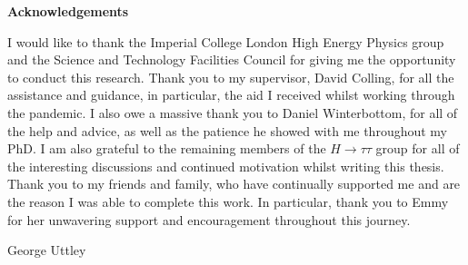 \begin{titlepage}
\newpage


\vspace*{\fill}
\begin{adjustwidth}{1cm}{1cm}
\begin{center}
\Large \textbf{Acknowledgements}
\vspace{0.5cm}
\end{center}

I would like to thank the Imperial College London High Energy Physics group and the Science and Technology Facilities Council for giving me the opportunity to conduct this research.
Thank you to my supervisor, David Colling, for all the assistance and guidance, in particular, the aid I received whilst working through the pandemic.
I also owe a massive thank you to Daniel Winterbottom, for all of the help and advice, as well as the patience he showed with me throughout my PhD.
I am also grateful to the remaining members of the $H\rightarrow\tau\tau$ group for all of the interesting discussions and continued motivation whilst writing this thesis.
Thank you to my friends and family, who have continually supported me and are the reason I was able to complete this work.
In particular, thank you to Emmy for her unwavering support and encouragement throughout this journey.

\begin{FlushRight}
George Uttley
\end{FlushRight}
\end{adjustwidth}
\vspace*{\fill}

\end{titlepage}